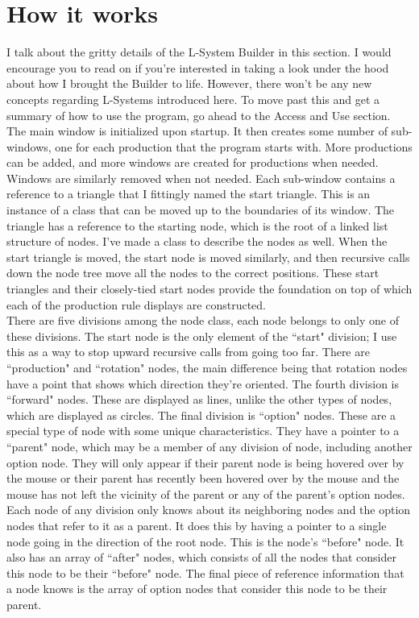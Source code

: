 \documentclass[12pt,twoside]{reedthesis}
\begin{document}
\section{How it works}

	I talk about the gritty details of the L-System Builder in this section. I would encourage you to read on if you're interested in taking a look under the hood about how I brought the Builder to life. However, there won't be any new concepts regarding L-Systems introduced here. To move past this and get a summary of how to use the program, go ahead to the Access and Use section.\\
	
	The main window is initialized upon startup. It then creates some number of sub-windows, one for each production that the program starts with. More productions can be added, and more windows are created for productions when needed. Windows are similarly removed when not needed. Each sub-window contains a reference to a triangle that I fittingly named the start triangle. This is an instance of a class that can be moved up to the boundaries of its window. The triangle has a reference to the starting node, which is the root of a linked list structure of nodes. I've made a class to describe the nodes as well. When the start triangle is moved, the start node is moved similarly, and then recursive calls down the node tree move all the nodes to the correct positions. These start triangles and their closely-tied start nodes provide the foundation on top of which each of the production rule displays are constructed.\\
	
	There are five divisions among the node class, each node belongs to only one of these divisions. The start node is the only element of the ``start" division; I use this as a way to stop upward recursive calls from going too far. There are ``production" and ``rotation" nodes, the main difference being that rotation nodes have a point that shows which direction they're oriented. The fourth division is ``forward" nodes. These are displayed as lines, unlike the other types of nodes, which are displayed as circles. The final division is ``option" nodes. These are a special type of node with some unique characteristics. They have a pointer to a ``parent" node, which may be a member of any division of node, including another option node. They will only appear if their parent node is being hovered over by the mouse or their parent has recently been hovered over by the mouse and the mouse has not left the vicinity of the parent or any of the parent's option nodes. Each node of any division only knows about its neighboring nodes and the option nodes that refer to it as a parent. It does this by having a pointer to a single node going in the direction of the root node. This is the node's ``before" node. It also has an array of ``after" nodes, which consists of all the nodes that consider this node to be their ``before" node. The final piece of reference information that a node knows is the array of option nodes that consider this node to be their parent.\\
	
\end{document}

